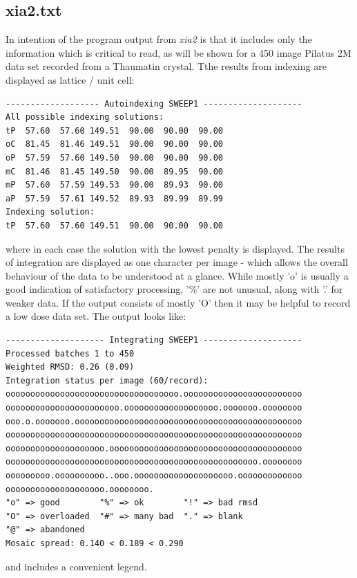 \documentclass[a4paper, 11pt]{article}
\begin{document}
\subsection{xia2.txt}

In intention of the program output from \emph{xia2} is that it includes only
the information which is critical to read, as will be shown for a 450 image 
Pilatus 2M data set recorded from a Thaumatin crystal. Tthe results from 
indexing are displayed as lattice / unit cell:

{\small
\begin{verbatim}
------------------- Autoindexing SWEEP1 --------------------
All possible indexing solutions:
tP  57.60  57.60 149.51  90.00  90.00  90.00
oC  81.45  81.46 149.51  90.00  90.00  90.00
oP  57.59  57.60 149.50  90.00  90.00  90.00
mC  81.46  81.45 149.50  90.00  89.95  90.00
mP  57.60  57.59 149.53  90.00  89.93  90.00
aP  57.59  57.61 149.52  89.93  89.99  89.99
Indexing solution:
tP  57.60  57.60 149.51  90.00  90.00  90.00
\end{verbatim}
}

\noindent
where in each case the solution with the lowest penalty is displayed. The 
results of integration are displayed as one character per image - which 
allows the overall behaviour of the data to be understood at a glance. While
mostly 'o' is usually a good indication of satisfactory processing, '\%'
are not unusual, along with '.' for weaker data. If the output consists
of mostly 'O' then it may be helpful to record a low dose data set. The output
looks like:

{\small
\begin{verbatim}
-------------------- Integrating SWEEP1 --------------------
Processed batches 1 to 450
Weighted RMSD: 0.26 (0.09)
Integration status per image (60/record):
ooooooooooooooooooooooooooooooooooo.oooooooooooooooooooooooo
ooooooooooooooooooooooo.ooooooooooooooooooo.ooooooo.oooooooo
ooo.o.ooooooo.oooooooooooooooooooooooooooooooooooooooooooooo
oooooooooooooooooooooooooooooooooooooooooooooooooooooooooooo
oooooooooooooooooooo.ooooooooooooooooooooooooooooooooooooooo
ooooooooooooooooooooooooooooooooooooooooooooooooooo.oooooooo
ooooooooo.oooooooooo..ooo.oooooooooooooooooooo.ooooooooooooo
oooooooooooooooooooo.oooooooo.
"o" => good        "%" => ok        "!" => bad rmsd
"O" => overloaded  "#" => many bad  "." => blank
"@" => abandoned
Mosaic spread: 0.140 < 0.189 < 0.290
\end{verbatim}
}

\noindent
and includes a convenient legend.
\end{document}

